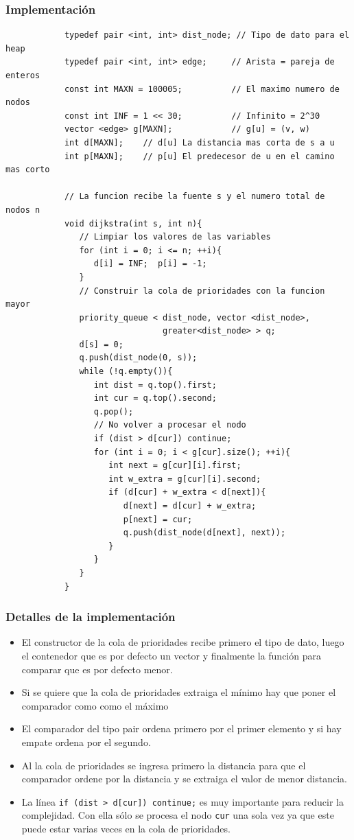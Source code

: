 \documentclass{beamer}
\begin{document}
	\begin{frame}
		\frametitle{Implementación}
		\begin{lstlisting}
			typedef pair <int, int> dist_node; // Tipo de dato para el heap
			typedef pair <int, int> edge;     // Arista = pareja de enteros
			const int MAXN = 100005;          // El maximo numero de nodos
			const int INF = 1 << 30;          // Infinito = 2^30
			vector <edge> g[MAXN];            // g[u] = (v, w)
			int d[MAXN];    // d[u] La distancia mas corta de s a u
			int p[MAXN];    // p[u] El predecesor de u en el camino mas corto

			// La funcion recibe la fuente s y el numero total de nodos n
			void dijkstra(int s, int n){
			   // Limpiar los valores de las variables
			   for (int i = 0; i <= n; ++i){
			      d[i] = INF;  p[i] = -1;
			   }
			   // Construir la cola de prioridades con la funcion mayor
			   priority_queue < dist_node, vector <dist_node>, 
			                    greater<dist_node> > q;
			   d[s] = 0;
			   q.push(dist_node(0, s));
			   while (!q.empty()){
			      int dist = q.top().first;
			      int cur = q.top().second;
			      q.pop();
			      // No volver a procesar el nodo
			      if (dist > d[cur]) continue;
			      for (int i = 0; i < g[cur].size(); ++i){
			         int next = g[cur][i].first;
			         int w_extra = g[cur][i].second;
			         if (d[cur] + w_extra < d[next]){
			            d[next] = d[cur] + w_extra;
			            p[next] = cur;
			            q.push(dist_node(d[next], next));
			         }
			      }
			   }  
			}
		\end{lstlisting}
	\end{frame}
	
	\begin{frame}[fragile]
		\frametitle{Detalles de la implementación}
		\begin{itemize}
			\item El constructor de la cola de prioridades recibe primero el tipo de dato, luego el contenedor que es por defecto un vector y finalmente la función para comparar que es por defecto menor.
			\item Si se quiere que la cola de prioridades extraiga el mínimo hay que poner el comparador como como el máximo
			\item El comparador del tipo pair ordena primero por el primer elemento y si hay empate ordena por el segundo.
			\item Al la cola de prioridades se ingresa primero la distancia para que el comparador ordene por la distancia y se extraiga el valor de menor distancia.
			\item La línea \verb|if (dist > d[cur]) continue;| es muy importante para reducir la complejidad. Con ella sólo se procesa el nodo \verb|cur| una sola vez ya que este puede estar varias veces en la cola de prioridades.
		\end{itemize}
	\end{frame}
	
\end{document}
